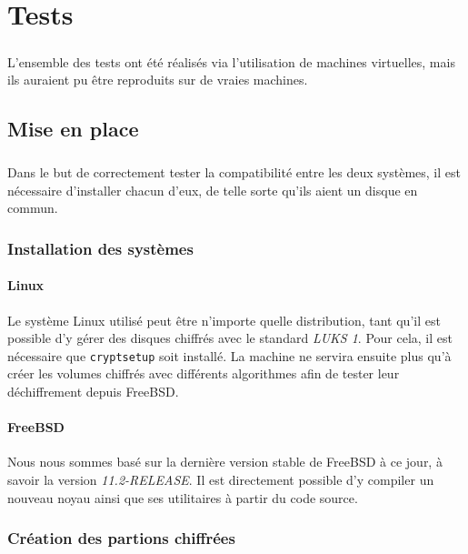 \chapter{Tests}

\paragraph{}
L'ensemble des tests ont été réalisés via l'utilisation de machines virtuelles,
mais ils auraient pu être reproduits sur de vraies machines.

\section{Mise en place}

\paragraph{}
Dans le but de correctement tester la compatibilité entre les deux systèmes, il
est nécessaire d'installer chacun d'eux, de telle sorte qu'ils aient un disque
en commun.

\subsection{Installation des systèmes}
\subsubsection{Linux}
Le système Linux utilisé peut être n'importe quelle distribution, tant qu'il est
possible d'y gérer des disques chiffrés avec le standard \textit{LUKS 1}. Pour
cela, il est nécessaire que \texttt{cryptsetup} soit installé. La machine ne
servira ensuite plus qu'à créer les volumes chiffrés avec différents algorithmes
afin de tester leur déchiffrement depuis FreeBSD.
\subsubsection{FreeBSD}
Nous nous sommes basé sur la dernière version stable de FreeBSD à ce jour, à
savoir la version \textit{11.2-RELEASE}. Il est directement possible d'y
compiler un nouveau noyau ainsi que ses utilitaires à partir du code source.

\subsection{Création des partions chiffrées}
